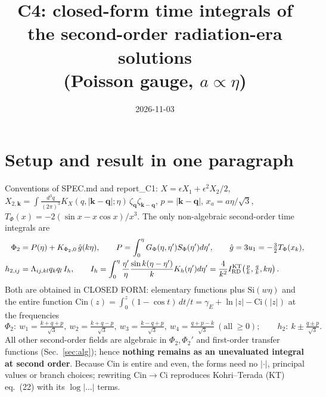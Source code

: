 \documentclass[10pt]{article}
\title{C4: closed-form time integrals of the second-order radiation-era solutions\\ (Poisson gauge, $a\propto\eta$)}
\date{2026-11-03}
\begin{document}
\maketitle
\section{Setup and result in one paragraph}
Conventions of SPEC.md and report\_C1: $X=\epsilon X_1+\epsilon^2X_2/2$, $X_{2,\mathbf k}=\int\frac{d^3q}{(2\pi)^3}K_X(q,|\mathbf k-\mathbf q|;\eta)\,\zeta_{\mathbf q}\zeta_{\mathbf k-\mathbf q}$,
$p=|\mathbf k-\mathbf q|$, $x_a=a\eta/\sqrt3$, $T_\Phi(x)=-2(\sin x-x\cos x)/x^3$.
The only non-algebraic second-order time integrals are
\begin{align}
\Phi_2&=P(\eta)+K_{\Phi_2,0}\,\hat g(k\eta),\qquad P=\int_0^\eta G_\Phi(\eta,\eta')S_\Phi(\eta')d\eta',\qquad \hat g=3u_1=-\tfrac32T_\Phi(x_k),\\
h_{2,ij}&=\Lambda_{ij,kl}q_kq_l\,I_h,\qquad I_h=\int_0^\eta \frac{\eta'}{\eta}\frac{\sin k(\eta-\eta')}{k}K_h(\eta')d\eta' = \frac{4}{k^2}I_{\rm RD}^{\rm KT}\!\left(\tfrac pk,\tfrac qk,k\eta\right).
\end{align}
Both are obtained in CLOSED FORM: elementary functions plus $\mathrm{Si}(w\eta)$ and the entire function
$\mathrm{Cin}(z)=\int_0^z(1-\cos t)\,dt/t=\gamma_E+\ln|z|-\mathrm{Ci}(|z|)$ at the frequencies
\[\Phi_2:\ w_1=\tfrac{k+q+p}{\sqrt3},\ w_2=\tfrac{k+q-p}{\sqrt3},\ w_3=\tfrac{k-q+p}{\sqrt3},\ w_4=\tfrac{q+p-k}{\sqrt3}\ (\text{all}\ \ge0);\qquad
h_2:\ k\pm\tfrac{q\pm p}{\sqrt3}.\]
All other second-order fields are algebraic in $\Phi_2,\Phi_2'$ and first-order transfer functions (Sec.~\ref{sec:alg}); hence
\textbf{nothing remains as an unevaluated integral at second order}. Because Cin is entire and even, the forms need no
$|\cdot|$, principal values or branch choices; rewriting $\mathrm{Cin}\to\mathrm{Ci}$ reproduces Kohri--Terada (KT) eq.~(22) with
its $\log|\ldots|$ terms.
\end{document}
